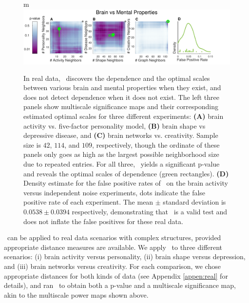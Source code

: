 \documentclass[11pt]{article}
\begin{document}
\begin{figure}[!ht]
m\includegraphics[width=1.0\textwidth,trim={0 0 1.5cm 0},clip]{Figures/FigReal}
\caption{In real data, \Mgc~discovers the dependence and the optimal scales between various brain and mental properties when they exist, and does not detect dependence when it does not exist.  The left three panels show multiscale significance maps and their corresponding estimated optimal scales for three different experiments: \textbf{(A)}  brain activity vs. five-factor personality model, \textbf{(B)}  brain shape vs depressive disease, and \textbf{(C)} brain networks vs. creativity. Sample size is $42$, $114$, and $109$, respectively, though the ordinate of these panels only goes as high as the largest possible neighborhood size due to repeated entries.  
For all three, \Mgc~yields a significant p-value and reveals the optimal scales of dependence (green rectangles).
\textbf{(D)} Density estimate for the false positive rates of  \Mgc~on the brain activity versus  independent noise experiments, dots indicate the false positive rate of each experiment. The mean $\pm$ standard deviation is $0.0538 \pm 0.0394$ respectively, demonstrating that \Mgc~is a valid test and does not inflate the false positives for these real data.}
\label{f:real}
\end{figure}

\Mgc~can be applied to real data scenarios with complex structures, provided appropriate distance measures are available. We apply \Mgc~to three different scenarios: (i) brain activity versus personality, (ii) brain shape versus depression, and (iii) brain networks versus creativity.  For each comparison, we chose appropriate distances for both kinds of data (see Appendix \ref{appen:real} for details), and ran \Mgc~to obtain both a p-value and a multiscale significance map, akin to the multiscale power maps shown above. 
\end{document}
